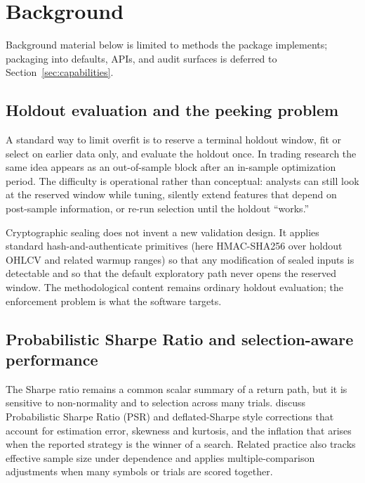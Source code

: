 \documentclass[article]{jss}
\begin{document}
\section[Background]{Background} \label{sec:background}

Background material below is limited to methods the package implements;
packaging into defaults, APIs, and audit surfaces is deferred to
Section~\ref{sec:capabilities}.

\subsection{Holdout evaluation and the peeking problem}

A standard way to limit overfit is to reserve a terminal holdout window,
fit or select on earlier data only, and evaluate the holdout once.
In trading research the same idea appears as an out-of-sample block after
an in-sample optimization period.  The difficulty is operational rather than
conceptual: analysts can still look at the reserved window while
tuning, silently extend features that depend on post-sample information, or
re-run selection until the holdout ``works.''

Cryptographic sealing does not invent a new validation design.  It applies
standard hash-and-authenticate primitives (here HMAC-SHA256 over holdout
OHLCV and related warmup ranges) so that any modification of sealed inputs
is detectable and so that the default exploratory path never opens the
reserved window.  The methodological content remains ordinary holdout
evaluation; the enforcement problem is what the software targets.

\subsection{Probabilistic Sharpe Ratio and selection-aware performance}

The Sharpe ratio remains a common scalar summary of a return path, but it
is sensitive to non-normality and to selection across many trials.
\citet{Bailey+LopezDePrado:2012,Bailey+LopezDePrado:2014} discuss Probabilistic Sharpe Ratio (PSR)
and deflated-Sharpe style corrections that account for estimation error,
skewness and kurtosis, and the inflation that arises when the reported
strategy is the winner of a search.  Related practice also tracks effective
sample size under dependence and applies multiple-comparison adjustments
when many symbols or trials are scored together.
\end{document}
